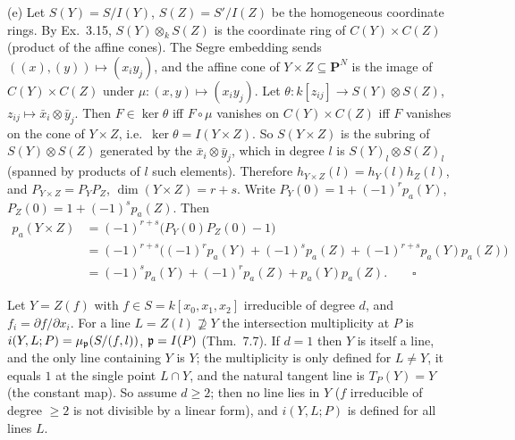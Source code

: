 \documentclass[11pt]{article}
\begin{document}
(e) Let $S(Y)=S/I(Y)$, $S(Z)=S'/I(Z)$ be the homogeneous coordinate rings. By Ex.~3.15, $S(Y)\otimes_kS(Z)$ is the coordinate ring of $C(Y)\times C(Z)$ (product of the affine cones). The Segre embedding sends $((x),(y))\mapsto(x_iy_j)$, and the affine cone of $Y\times Z\subseteq\mathbf P^N$ is the image of $C(Y)\times C(Z)$ under $\mu:(x,y)\mapsto(x_iy_j)$. Let $\theta:k[z_{ij}]\to S(Y)\otimes S(Z)$, $z_{ij}\mapsto\bar x_i\otimes\bar y_j$. Then $F\in\ker\theta$ iff $F\circ\mu$ vanishes on $C(Y)\times C(Z)$ iff $F$ vanishes on the cone of $Y\times Z$, i.e.\ $\ker\theta=I(Y\times Z)$. So $S(Y\times Z)$ is the subring of $S(Y)\otimes S(Z)$ generated by the $\bar x_i\otimes\bar y_j$, which in degree $l$ is $S(Y)_l\otimes S(Z)_l$ (spanned by products of $l$ such elements). Therefore $h_{Y\times Z}(l)=h_Y(l)h_Z(l)$, and $P_{Y\times Z}=P_YP_Z$, $\dim(Y\times Z)=r+s$. Write $P_Y(0)=1+(-1)^rp_a(Y)$, $P_Z(0)=1+(-1)^sp_a(Z)$. Then
\begin{align*}
p_a(Y\times Z)&=(-1)^{r+s}\big(P_Y(0)P_Z(0)-1\big)\\
&=(-1)^{r+s}\big((-1)^rp_a(Y)+(-1)^sp_a(Z)+(-1)^{r+s}p_a(Y)p_a(Z)\big)\\
&=(-1)^sp_a(Y)+(-1)^rp_a(Z)+p_a(Y)p_a(Z).\qquad\square
\end{align*}

\pf
Let $Y=Z(f)$ with $f\in S=k[x_0,x_1,x_2]$ irreducible of degree $d$, and $f_i=\partial f/\partial x_i$. For a line $L=Z(l)\not\supseteq Y$ the intersection multiplicity at $P$ is $i(Y,L;P)=\mu_{\mathfrak p}(S/(f,l))$, $\mathfrak p=I(P)$ (Thm.~7.7). If $d=1$ then $Y$ is itself a line, and the only line containing $Y$ is $Y$; the multiplicity is only defined for $L\ne Y$, it equals $1$ at the single point $L\cap Y$, and the natural tangent line is $T_P(Y)=Y$ (the constant map). So assume $d\ge2$; then no line lies in $Y$ ($f$ irreducible of degree $\ge2$ is not divisible by a linear form), and $i(Y,L;P)$ is defined for all lines $L$.
\end{document}
